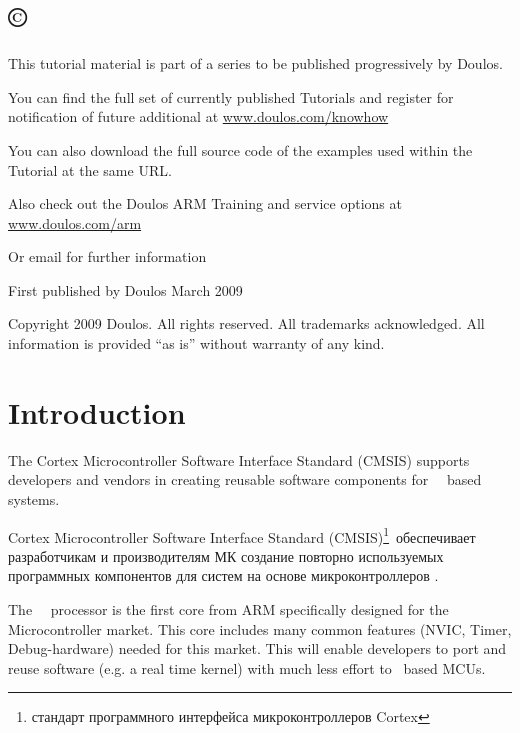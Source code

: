 

\usepackage{tcolorbox}
\newcommand{\ru}[1]{{\color{blue}#1}}


\maketitle
\setcounter{tocdepth}{3}\tableofcontents

\section{\copyright}

\bigskip
This tutorial material is part of a series to be published progressively by
Doulos.

\bigskip
You can find the full set of currently published Tutorials and register for
notification of future additional at \url{www.doulos.com/knowhow}

\bigskip
You can also download the full source code of the examples used within the
Tutorial at the same URL.

\bigskip
Also check out the Doulos ARM Training and service options at
\url{www.doulos.com/arm}

\bigskip
Or email  for further information

\bigskip
First published by Doulos March 2009

\bigskip
Copyright 2009 Doulos. All rights reserved. All trademarks acknowledged. All
information is provided “as is” without warranty of any kind.

\section{Introduction}

The Cortex Microcontroller Software Interface Standard (CMSIS) supports
developers and vendors in creating reusable software components for 
\arm\ \cm{}\ based systems.

\ru{
Cortex Microcontroller Software Interface Standard (CMSIS)\footnote{стандарт
программного интерфейса микроконтроллеров Cortex}\ обеспечивает разработчикам и
производителям МК создание повторно используемых программных компонентов для
систем на основе микроконтроллеров \cm{}.
}

The \arm\ \ processor is the first core from ARM specifically designed for
the Microcontroller market. This core includes many common features (NVIC,
Timer, Debug-hardware) needed for this market. This will enable developers to
port and reuse software (e.g. a real time kernel) with much less effort to
\ based MCUs.

